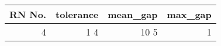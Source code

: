 \begin{tabular}{rrrr}
\toprule
 RN No. & tolerance & mean_gap & max_gap \\
\midrule
      4 &        1%
      4 &       10%
      5 &        1%
\bottomrule
\end{tabular}

